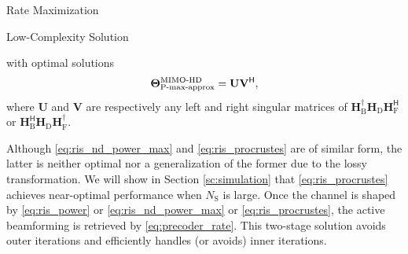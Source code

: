 \documentclass[journal]{IEEEtran}
\begin{document}
\begin{section}{Rate Maximization}
\begin{subsection}{Low-Complexity Solution}
\begin{itemize}
\begin{mini!}
			\end{mini!}
			with optimal solutions \cite[(6.4.1)]{Golub2013}
			\begin{equation}
				\label{eq:ris_procrustes}
				\mathbf{\Theta}_\textnormal{P-max-approx}^\textnormal{MIMO-HD} = \mathbf{U} \mathbf{V}^\mathsf{H},
			\end{equation}
			where $\mathbf{U}$ and $\mathbf{V}$ are respectively any left and right singular matrices of $\mathbf{H}_\mathrm{B}^\dagger \mathbf{H}_\mathrm{D} \mathbf{H}_\mathrm{F}^\mathsf{H}$ or $\mathbf{H}_\mathrm{B}^\mathsf{H} \mathbf{H}_\mathrm{D} \mathbf{H}_\mathrm{F}^\dagger$.
		\end{itemize}

		Although \eqref{eq:ris_nd_power_max} and \eqref{eq:ris_procrustes} are of similar form, the latter is neither optimal nor a generalization of the former due to the lossy transformation.
		We will show in Section \ref{sc:simulation} that \eqref{eq:ris_procrustes} achieves near-optimal performance when $N_\mathrm{S}$ is large.
		Once the channel is shaped by \eqref{eq:ris_power} or \eqref{eq:ris_nd_power_max} or \eqref{eq:ris_procrustes}, the active beamforming is retrieved by \eqref{eq:precoder_rate}.
		This two-stage solution avoids outer iterations and efficiently handles (or avoids) inner iterations.
	\end{subsection}



\end{section}
\end{document}
